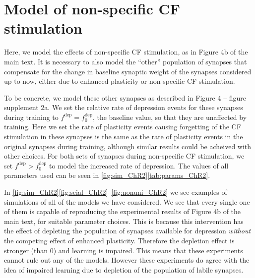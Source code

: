\documentclass[10pt]{article}
\newcommand{\dep}{^{\text{dep}}}
\newcommand{\norm}{_0}
\newcommand{\chrfig}[1][b]{Figure 4#1 of the main text}
\newcommand{\compfig}[1][a]{Figure 4 -- figure supplement 2#1}
\begin{document}


\section{Model of non-specific CF stimulation}\label{sec:chr2}

Here, we model the effects of non-specific CF stimulation, as in \chrfig.
It is necessary to also model the ``other'' population of synapses that compensate for the change in baseline synaptic weight of the synapses considered up to now, either due to enhanced plasticity or non-specific CF stimulation.

To be concrete, we model these other synapses as described in \compfig.
We set the relative rate of depression events for these synapses during training to $f\dep = f\dep\norm$, \ie the baseline value, so that they are unaffected by training.
Here we set the rate of plasticity events causing forgetting of the CF stimulation in these synapses is the same as the rate of plasticity events in the original synapses during training, although similar results could be acheived with other choices.
For both sets of synapses during non-specific CF stimulation, we set $f\dep > f\dep\norm$ to model the increased rate of depression.
The values of all parameters used can be seen in \autoref{fig:sim_ChR2}\ref{tab:params_ChR2}.

In \autoref{fig:sim_ChR2}\ref{fig:seial_ChR2}--\ref{fig:nonuni_ChR2} we see examples of simulations of all of the models we have considered.
We see that every single one of them is capable of reproducing the experimental results of \chrfig, for suitable parameter choices.
This is because this intervention has the effect of depleting the population of synapses available for depression \emph{without} the competing effect of enhanced plasticity.
Therefore the depletion effect is stronger (than 0) and learning is impaired.
This means that these experiments cannot rule out any of the models.
However these experiments do agree with the idea of impaired learning due to depletion of the population of labile synapses.
\end{document}
